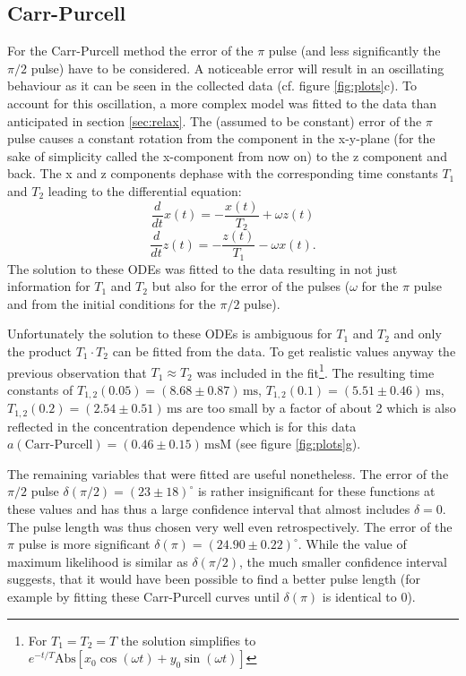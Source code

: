 \documentclass[a4paper]{scrartcl}
\numberwithin{equation}{section}
\numberwithin{figure}{section}
\numberwithin{table}{section}
\newcommand{\eq}[2]{\begin{equation}#1\label{#2}\end{equation}}
\begin{document}
\subsection{Carr-Purcell}
For the Carr-Purcell method the error of the $\pi$ pulse (and less significantly the $\pi/2$ pulse) have to be considered. A noticeable error will result in an oscillating behaviour as it can be seen in the collected data (cf. figure \ref{fig:plots}c). To account for this oscillation, a more complex model was fitted to the data than anticipated in section \ref{sec:relax}. The (assumed to be constant) error of the $\pi$ pulse causes a constant rotation from the component in the x-y-plane (for the sake of simplicity called the x-component from now on) to the z component and back. The x and z components dephase with the corresponding time constants $T_1$ and $T_2$ leading to the differential equation:
\eq{\frac{d}{dt}x(t) = -\frac{x(t)}{T_2} + \omega z(t)}{}
\eq{\frac{d}{dt}z(t) = -\frac{z(t)}{T_1} - \omega x(t) .}{}
The solution to these ODEs was fitted to the data resulting in not just information for $T_1$ and $T_2$ but also for the error of the pulses ($\omega$ for the $\pi$ pulse and from the initial conditions for the $\pi/2$ pulse).

Unfortunately the solution to these ODEs is ambiguous for $T_1$ and $T_2$ and only the product $T_1 \cdot T_2$ can be fitted from the data. To get realistic values anyway the previous observation that $T_1 \approx T_2$ was included in the fit\footnote{For $T_1=T_2=T$ the solution simplifies to $e^{-t/T} \text{Abs}[x_0 \cos(\omega t)+y_0 \sin(\omega t)]$}. The resulting time constants of $T_{1,2}(0.05)=(8.68\pm0.87)\,\text{ms}$, $T_{1,2}(0.1)=(5.51\pm 0.46)\,\text{ms}$, $T_{1,2}(0.2)=(2.54\pm 0.51)\,\text{ms}$ are too small by a factor of about 2 which is also reflected in the concentration dependence which is for this data $a(\text{Carr-Purcell})=(0.46\pm 0.15)\,\text{msM}$ (see figure \ref{fig:plots}g).%

The remaining variables that were fitted are useful nonetheless. The error of the $\pi/2$ pulse $\delta(\pi/2) = (23 \pm 18)^\circ$ is rather insignificant for these functions at these values and has thus a large confidence interval that almost includes $\delta = 0$. The pulse length was thus chosen very well even retrospectively. The error of the $\pi$ pulse is more significant $\delta(\pi)=(24.90\pm 0.22)^\circ$. While the value of maximum likelihood is similar as $\delta(\pi/2)$, the much smaller confidence interval suggests, that it would have been possible to find a better pulse length (for example by fitting these Carr-Purcell curves until $\delta(\pi)$ is identical to 0). 
\end{document}
